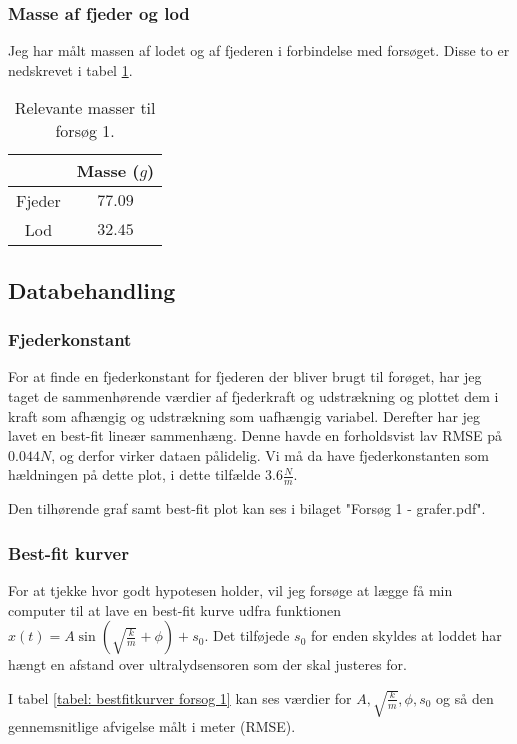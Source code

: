 \subsubsection{Masse af fjeder og lod}
Jeg har målt massen af lodet og af fjederen i forbindelse med forsøget. 
Disse to er nedskrevet i tabel \ref{tabel: Masser forsog 1}.
\begin{table}[h]
\centering
\begin{tabular}{|c|c|}
\hline 
 & Masse ($g$) \\ 
\hline 
Fjeder & $77.09$ \\ 
\hline 
Lod & $32.45$ \\ 
\hline 
\end{tabular} 
\caption{Relevante masser til forsøg 1.}
\label{tabel: Masser forsog 1}
\end{table}

\subsection{Databehandling}
\subsubsection{Fjederkonstant}\label{databehandling: tyk fjeder fjederkonstant}
For at finde en fjederkonstant for fjederen der bliver brugt til forøget, har jeg taget de sammenhørende værdier af fjederkraft og udstrækning og plottet dem i kraft som afhængig og udstrækning som uafhængig variabel. 
Derefter har jeg lavet en best-fit lineær sammenhæng. 
Denne havde en forholdsvist lav RMSE på $0.044N$, og derfor virker dataen pålidelig. 
Vi må da have fjederkonstanten som hældningen på dette plot, i dette tilfælde $3.6\frac{N}{m}$.

Den tilhørende graf samt best-fit plot kan ses i bilaget "Forsøg 1 - grafer.pdf". 
 

\subsubsection{Best-fit kurver}
For at tjekke hvor godt hypotesen holder, vil jeg forsøge at lægge få min computer til at lave en best-fit kurve udfra funktionen $x(t)=A\sin (\sqrt{\frac{k}{m}}+\phi) + s_0$.
Det tilføjede $s_0$ for enden skyldes at loddet har hængt en afstand over ultralydsensoren som der skal justeres for. 

I tabel \ref{tabel: bestfitkurver forsog 1} kan ses værdier for $A, \sqrt{\frac{k}{m}}, \phi ,s_0$ og så den gennemsnitlige afvigelse målt i meter (RMSE).


